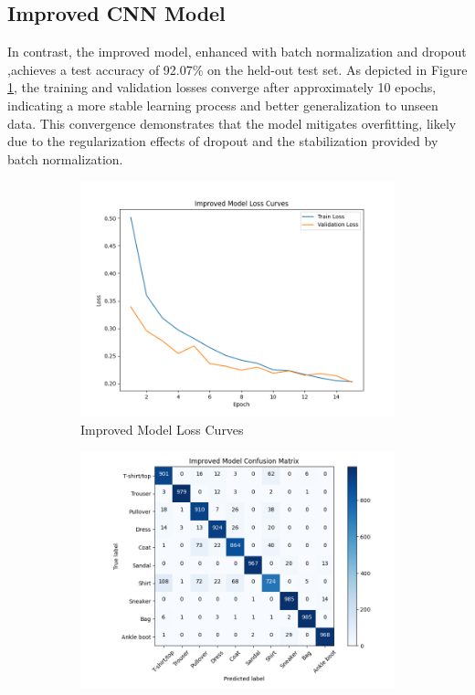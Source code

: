 \documentclass[letterpaper]{article}
\begin{document}
	\subsection*{Improved CNN Model}
	
	In contrast, the improved model, enhanced with batch normalization and dropout ,achieves a test accuracy of 92.07\% on the held-out test set. As depicted in Figure \ref{fig:improved_loss}, the training and validation losses converge after approximately 10 epochs, indicating a more stable learning process and better generalization to unseen data. This convergence demonstrates that the model mitigates overfitting, likely due to the regularization effects of dropout and the stabilization provided by batch normalization.
	
	\begin{figure}[H]
		\centering
		\begin{subfigure}{0.49\linewidth}
			\centering
			\includegraphics[width=\linewidth]{improved_loss_curves.png}
			\caption{Improved Model Loss Curves}
			\label{fig:improved_loss}
		\end{subfigure}
		\hfill
		\begin{subfigure}{0.49\linewidth}
			\centering
			\includegraphics[width=\linewidth]{improved_confusion_matrix.png}

\end{subfigure}
\end{figure}
\end{document}
